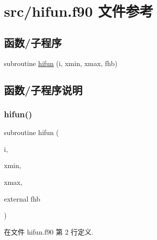 \hypertarget{hifun_8f90}{}\section{src/hifun.f90 文件参考}
\label{hifun_8f90}
\subsection*{函数/子程序}
\begin{DoxyCompactItemize}
\item 
subroutine \mbox{\hyperlink{hifun_8f90_a1995b86237e7d84791d3f2dc00055fab}{hifun}} (i, xmin, xmax, fhb)
\end{DoxyCompactItemize}


\subsection{函数/子程序说明}
\mbox{\label{hifun_8f90_a1995b86237e7d84791d3f2dc00055fab}} 
\subsubsection{\texorpdfstring{hifun()}{hifun()}}
{\footnotesize\ttfamily subroutine hifun (\begin{DoxyParamCaption}\item[{}]{i,  }\item[{}]{xmin,  }\item[{}]{xmax,  }\item[{external}]{fhb }\end{DoxyParamCaption})}



在文件 hifun.\+f90 第 2 行定义.

